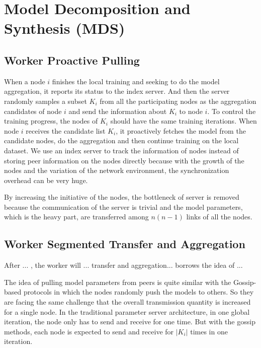 
\section{Model Decomposition and Synthesis (MDS)}
\subsection{Worker Proactive Pulling}
When a node $i$ finishes the local training and seeking to do the model aggregation, it reports its status to the index server. And then the server randomly samples a subset $K_i$ from all the participating nodes as the aggregation candidates of node $i$ and send the information about $K_i$ to node $i$. To control the training progress, the nodes of $K_i$ should have the same training iterations. When node $i$ receives the candidate list $K_i$, it proactively fetches the model from the candidate nodes, do the aggregation and then continue training on the local dataset. We use an index server to track the information of nodes instead of storing peer information on the nodes directly because with the growth of the nodes and the variation of the network environment, the synchronization overhead can be very huge.

 By increasing the initiative of the nodes, the bottleneck of server is removed because the communication of the server is trivial and the model parameters, which is the heavy part, are transferred among $n(n-1)$ links of all the nodes.

\subsection{Worker Segmented Transfer and Aggregation}
After ... , the worker will ... transfer and aggregation...
\sys borrows the idea of ...

The idea of pulling model parameters from peers is quite similar with the Gossip-based protocols in which the nodes randomly push the models to others. So they are facing the same challenge that the overall transmission quantity is increased for a single node. In the traditional parameter server architecture, in one global iteration, the node only has to send and receive for one time. But with the gossip methods, each node is expected to send and receive for $|K_i|$ times in one iteration. 
